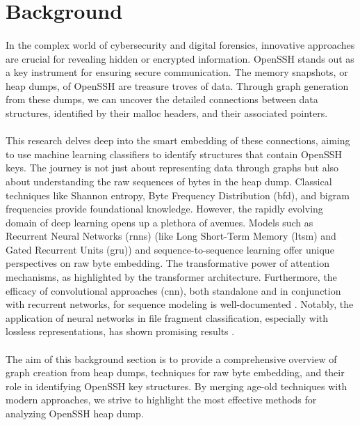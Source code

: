 \section{Background}\label{chap:background}


\paragraph*{}In the complex world of cybersecurity and digital forensics, innovative approaches are crucial for revealing hidden or encrypted information. OpenSSH stands out as a key instrument for ensuring secure communication. The memory snapshots, or heap dumps, of OpenSSH are treasure troves of data. Through graph generation from these dumps, we can uncover the detailed connections between data structures, identified by their malloc headers, and their associated pointers.

\paragraph*{}This research delves deep into the smart embedding of these connections, aiming to use machine learning classifiers to identify structures that contain OpenSSH keys. The journey is not just about representing data through graphs but also about understanding the raw sequences of bytes in the heap dump. Classical techniques like Shannon entropy, Byte Frequency Distribution (\acrshort{bfd}), and bigram frequencies provide foundational knowledge. However, the rapidly evolving domain of deep learning opens up a plethora of avenues. Models such as Recurrent Neural Networks (\acrshort{rnn}s) \cite{lai_recurrent_2015} (like Long Short-Term Memory (\acrshort{ltsm}) \cite{hochreiter_long_1997} and Gated Recurrent Units (\acrshort{gru})\cite{chung_empirical_2014}) and sequence-to-sequence learning \cite{sutskever_sequence_2014} offer unique perspectives on raw byte embedding. The transformative power of attention mechanisms, as highlighted by the transformer architecture\cite{vaswani_attention_2017}. Furthermore, the efficacy of convolutional approaches (\acrshort{cnn}), both standalone and in conjunction with recurrent networks, for sequence modeling is well-documented \cite{bai_empirical_2018}. Notably, the application of neural networks in file fragment classification, especially with lossless representations, has shown promising results \cite{hiester_file_2018}.

\paragraph*{}The aim of this background section is to provide a comprehensive overview of graph creation from heap dumps, techniques for raw byte embedding, and their role in identifying OpenSSH key structures. By merging age-old techniques with modern approaches, we strive to highlight the most effective methods for analyzing OpenSSH heap dump.

